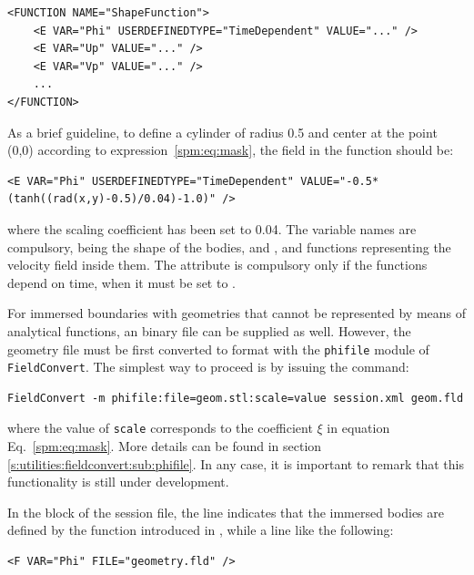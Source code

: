 \begin{lstlisting}[style=XMLStyle]
<FUNCTION NAME="ShapeFunction">
    <E VAR="Phi" USERDEFINEDTYPE="TimeDependent" VALUE="..." />
    <E VAR="Up" VALUE="..." />
    <E VAR="Vp" VALUE="..." />
    ...
</FUNCTION>
\end{lstlisting}

As a brief guideline, to define a cylinder of radius 0.5 and center at the point
(0,0) according to expression~\eqref{spm:eq:mask}, the  field in
the  function should be:

\begin{lstlisting}[style=XMLStyle]
    <E VAR="Phi" USERDEFINEDTYPE="TimeDependent" VALUE="-0.5*(tanh((rad(x,y)-0.5)/0.04)-1.0)" />
\end{lstlisting}

where the scaling coefficient has been set to 0.04. The variable names are
compulsory, being  the shape of the bodies, and ,
 and  functions representing the velocity field inside
them. The attribute  is compulsory only if the functions
depend on time, when it must be set to .

For immersed boundaries with geometries that cannot be represented by means of
analytical functions, an  binary file can be supplied as well.
However, the geometry file must be first converted to  format with
the \texttt{phifile} module of \texttt{FieldConvert}. The simplest way to
proceed is by issuing the command:

\begin{lstlisting}[style=BashInputStyle]
    FieldConvert -m phifile:file=geom.stl:scale=value session.xml geom.fld
\end{lstlisting}

where the value of \texttt{scale} corresponds to the coefficient $\xi$ in
equation Eq.~\eqref{spm:eq:mask}. More details can be found in section~
\ref{s:utilities:fieldconvert:sub:phifile}. In any case, it is important to
remark that this functionality is still under development.

In the  block of the session file, the line
 indicates that the immersed bodies are defined by
the function introduced in , while a line like the following:

\begin{lstlisting}[style=XMLStyle]
    <F VAR="Phi" FILE="geometry.fld" />
\end{lstlisting}


